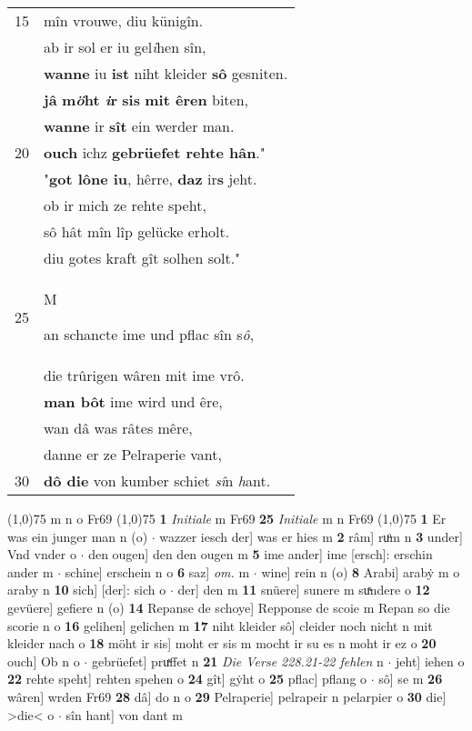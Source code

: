 \documentclass[8pt,a4paper,notitlepage]{article}
\begin{document}
\begin{table}[ht]
\begin{minipage}[t]{0.5\linewidth}
\begin{tabular}{rl}
15 & mîn vrouwe, diu künigîn.\\ 
 & ab ir sol er iu gel\textit{i}hen sîn,\\ 
 & \textbf{wanne} iu \textbf{ist} niht kleider \textbf{sô} gesniten.\\ 
 & \textbf{jâ} \textbf{m\textit{ö}ht \textit{i}r} \textbf{si}\textbf{s} \textbf{mit êren} biten,\\ 
 & \textbf{wanne} ir \textbf{sît} ein werder man.\\ 
20 & \textbf{ouch} ichz \textbf{gebrüefet rehte hân}."\\ 
 & "\textbf{got lône iu}, hêrre, \textbf{daz} ir\textbf{s} jeht.\\ 
 & ob ir mich ze rehte speht,\\ 
 & sô hât mîn lîp gelücke erholt.\\ 
 & diu gotes kraft gît solhen solt."\\ 
25 & \begin{large}M\end{large}an schancte ime und pflac sîn s\textit{ô},\\ 
 & die trûrigen wâren mit ime vrô.\\ 
 & \textbf{man bôt} ime wird und êre,\\ 
 & wan dâ was râtes mêre,\\ 
 & danne er ze Pelraperie vant,\\ 
30 & \textbf{dô die} von kumber schiet \textit{sî}n \textit{h}ant.\\ 
\end{tabular}
\scriptsize
\line(1,0){75} \newline
m n o Fr69 \newline
\line(1,0){75} \newline
\textbf{1} \textit{Initiale} m Fr69  \textbf{25} \textit{Initiale} m n Fr69  \newline
\line(1,0){75} \newline
\textbf{1} Er was ein junger man n (o)  $\cdot$ wazzer iesch der] was er hies m \textbf{2} râm] ruͦm n \textbf{3} under] Vnd vnder o  $\cdot$ den ougen] den den ougen m \textbf{5} ime ander] ime [ersch]: erschin ander m  $\cdot$ schine] erschein n o \textbf{6} saz] \textit{om.} m  $\cdot$ wine] rein n (o) \textbf{8} Arabi] arabẏ m o araby n \textbf{10} sich] [der]: sich o  $\cdot$ der] den m \textbf{11} snüere] sunere m suͯndere o \textbf{12} gevüere] gefiere n (o) \textbf{14} Repanse de schoye] Repponse de scoie m Repan so die scorie n o \textbf{16} gelihen] gelichen m \textbf{17} niht kleider sô] cleider noch nicht n mit kleider nach o \textbf{18} möht ir sis] moht er sis m mocht ir su es n moht ir ez o \textbf{20} ouch] Ob n o  $\cdot$ gebrüefet] pruͯffet n \textbf{21} \textit{Die Verse 228.21-22 fehlen} n   $\cdot$ jeht] iehen o \textbf{22} rehte speht] rehten spehen o \textbf{24} gît] gẏht o \textbf{25} pflac] pflang o  $\cdot$ sô] se m \textbf{26} wâren] wrden Fr69 \textbf{28} dâ] do n o \textbf{29} Pelraperie] pelrapeir n pelarpier o \textbf{30} die] >die< o  $\cdot$ sîn hant] von dant m \newline
\end{minipage}
\end{table}
\end{document}
